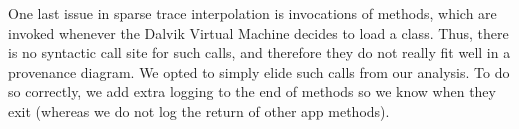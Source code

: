 One last issue in sparse trace interpolation is invocations of
 methods, which are invoked whenever the Dalvik Virtual
Machine decides to load a class. Thus, there is no syntactic call site
for such calls, and therefore they do not really fit well in a
provenance diagram. We opted to simply elide such calls from our
analysis. To do so correctly, we add extra logging to the end of
 methods so we know when they exit (whereas we do not
log the return of other app methods).





